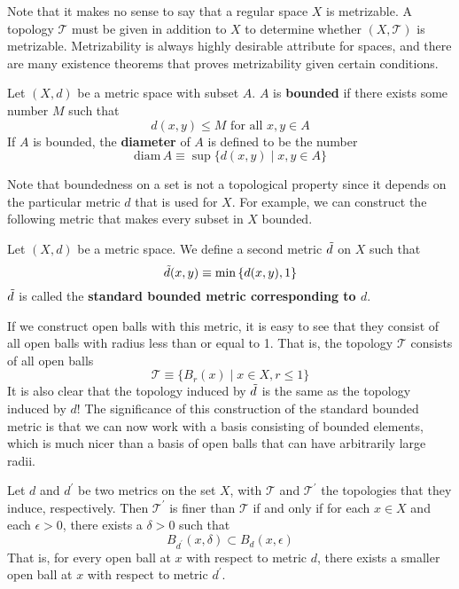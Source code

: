   Note that it makes no sense to say that a regular space $X$ is metrizable. A topology $\mathscr{T}$ must be given in addition to $X$ to determine whether $(X, \mathscr{T})$ is metrizable. Metrizability is always highly desirable attribute for spaces, and there are many existence theorems that proves metrizability given certain conditions. 

  \begin{definition}
  Let $(X, d)$ be a metric space with subset $A$. $A$ is \textbf{bounded} if there exists some number $M$ such that
  \[d (x, y) \leq M \text{ for all } x,y \in A\]
  If $A$ is bounded, the \textbf{diameter} of $A$ is defined to be the number
  \[\text{diam}\, A \equiv \sup{\{d(x, y) \; | \; x, y \in A\}}\]
  \end{definition}

  Note that boundedness on a set is not a topological property since it depends on the particular metric $d$ that is used for $X$. For example, we can construct the following metric that makes every subset in $X$ bounded. 

  \begin{definition}
  Let $(X, d)$ be a metric space. We define a second metric $\Tilde{d}$ on $X$ such that
  \[\Tilde{d} (x, y) \equiv \min{\{d(x, y), 1\}}\]
  $\Tilde{d}$ is called the \textbf{standard bounded metric corresponding to $d$}. 
  \end{definition}

  If we construct open balls with this metric, it is easy to see that they consist of all open balls with radius less than or equal to 1. That is, the topology $\mathscr{T}$ consists of all open balls
  \[\mathscr{T} \equiv \{B_r (x) \; | \; x \in X, r \leq 1\}\]
  It is also clear that the topology induced by $\Tilde{d}$ is the same as the topology induced by $d$! The significance of this construction of the standard bounded metric is that we can now work with a basis consisting of bounded elements, which is much nicer than a basis of open balls that can have arbitrarily large radii.  

  \begin{lemma}
  Let $d$ and $d^\prime$ be two metrics on the set $X$, with $\mathscr{T}$ and $\mathscr{T}^\prime$ the topologies that they induce, respectively. Then $\mathscr{T}^\prime$ is finer than $\mathscr{T}$ if and only if for each $x \in X$ and each $\epsilon > 0$, there exists a $\delta > 0$ such that
  \[B_{d^\prime} (x, \delta) \subset B_d (x, \epsilon)\]
  That is, for every open ball at $x$ with respect to metric $d$, there exists a smaller open ball at $x$ with respect to metric $d^\prime$. 
  \end{lemma}

